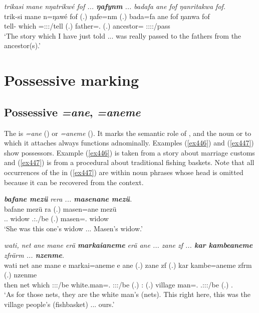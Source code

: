 \begin{exe}
	\ex \emph{trikasi mane nŋatrikwé fof ... \textbf{ŋafynm} ... badafa ane fof ŋanritakwa fof.}\\
	\gll trik-si mane n=ŋawé fof (.) ŋafe=nm (.) bada=fa ane fof ŋanwa fof\\
	tell-\Nmlz{} which \Immpst=\Fsg:\Sbj:\Nonpast:\Ipfv/tell \Emph{} (.) father=\Dat.\Nsg{} (.) ancestor=\Abl{} \Dem{} \Emph{} \Stsg:\Obj:\Pst:\Ipfv:\Venit/pass \Emph{}\\
	\trans `The story which I have just told ... was really passed to the fathers from the ancestor(s).'
	\label{ex461}
\end{exe}

\section{Possessive marking}\label{possessivemarking}
	
\subsection{Possessive \emph{=ane}, \emph{=aneme}} \label{posscase}

The   is \emph{=ane} (\Sg) or \emph{=aneme} (\Nsg). It marks the semantic role of , and the noun or  to which it attaches always functions adnominally. Examples (\ref{ex446}) and (\ref{ex447}) show  possessors. Example (\ref{ex446}) is taken from a story about marriage customs and (\ref{ex447}) is from a procedural about traditional fishing baskets. Note that all occurrences of the   in (\ref{ex447}) are within noun phrases whose  head is omitted because it can be recovered from the context.

\begin{exe}
	\ex \emph{\textbf{bafane mezü} rera ... \textbf{masenane mezü}.}\\
	\gll bafane mezü ra (.) masen=ane mezü\\
	\Recog.\Poss.\Sg{} widow \Tsg.\F:\Pst.\Ipfv/be (.) masen=\Poss.\Sg{} widow\\
	\trans `She was this one's widow ... Masen's widow.'
	\label{ex446}
\end{exe}
\begin{exe}
	\ex \emph{wati, net ane mane erä \textbf{markaianeme} erä ane ... zane zf ... \textbf{kar kambeaneme} zfrärm ... \textbf{nzenme}.}\\
	\gll wati net ane mane e markai=aneme e ane (.) zane zf (.) kar kambe=aneme zfrm (.) nzenme\\
	then net \Dem{} which \Stpl:\Sbj:\Nonpast:\Ipfv/be {white.man=\Poss.\Nsg} \Stpl:\Sbj:\Nonpast:\Ipfv/be \Dem{} (.) \Dem:\Prox{} \Imm{} (.) village man=\Poss.\Nsg{} \Tsg.\F:\Sbj:\Pst:\Dur/be (.) \Fnsg.\Poss{}\\ 
	\trans `As for those nets, they are the white man's (nets). This right here, this was the village people's (fishbasket) ... ours.'
	\label{ex447}
\end{exe}

